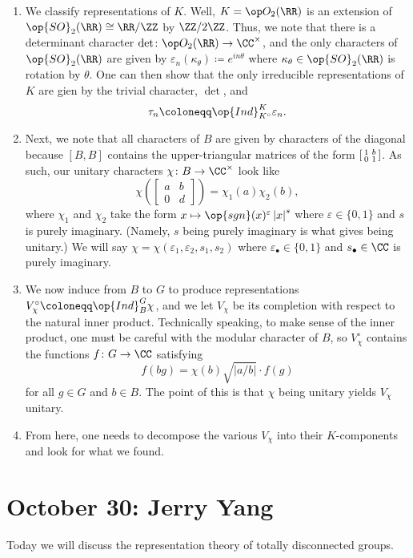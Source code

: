 \documentclass{article}
\begin{document}
\begin{enumerate}
	\item We classify representations of $K$. Well, $K=\op O_2(\RR)$ is an extension of $\op{SO}_2(\RR)\cong\RR/\ZZ$ by $\ZZ/2\ZZ$. Thus, we note that there is a determinant character $\det\colon\op O_2(\RR)\to\CC^\times$, and the only characters of $\op{SO}_2(\RR)$ are given by $\varepsilon_n(\kappa_\theta)\coloneqq e^{in\theta}$ where $\kappa_\theta\in\op{SO}_2(\RR)$ is rotation by $\theta$. One can then show that the only irreducible representations of $K$ are gien by the trivial character, $\det$, and
	\[\tau_n\coloneqq\op{Ind}_{K^\circ}^K\varepsilon_n.\]
	\item Next, we note that all characters of $B$ are given by characters of the diagonal because $[B,B]$ contains the upper-triangular matrices of the form $\begin{bsmallmatrix}
		1 & b \\ 0 & 1
	\end{bsmallmatrix}$. As such, our unitary characters $\chi\colon B\to\CC^\times$ look like
	\[\chi\left(\begin{bmatrix}
		a & b \\ 0 & d
	\end{bmatrix}\right)=\chi_1(a)\chi_2(b),\]
	where $\chi_1$ and $\chi_2$ take the form $x\mapsto\op{sgn}(x)^\varepsilon\left|x\right|^s$ where $\varepsilon\in\{0,1\}$ and $s$ is purely imaginary. (Namely, $s$ being purely imaginary is what gives being unitary.) We will say $\chi=\chi(\varepsilon_1,\varepsilon_2,s_1,s_2)$ where $\varepsilon_\bullet\in\{0,1\}$ and $s_\bullet\in\CC$ is purely imaginary.
	\item We now induce from $B$ to $G$ to produce representations $V_\chi^\circ\coloneqq\op{Ind}_B^G\chi$, and we let $V_\chi$ be its completion with respect to the natural inner product. Technically speaking, to make sense of the inner product, one must be careful with the modular character of $B$, so $V_\chi^\circ$ contains the functions $f\colon G\to\CC$ satisfying
	\[f(bg)=\chi(b)\sqrt{\left|a/b\right|}\cdot f(g)\]
	for all $g\in G$ and $b\in B$. The point of this is that $\chi$ being unitary yields $V_\chi$ unitary.
	\item From here, one needs to decompose the various $V_\chi$ into their $K$-components and look for what we found.
\end{enumerate}

\section{October 30: Jerry Yang}
Today we will discuss the representation theory of totally disconnected groups.
\end{document}
